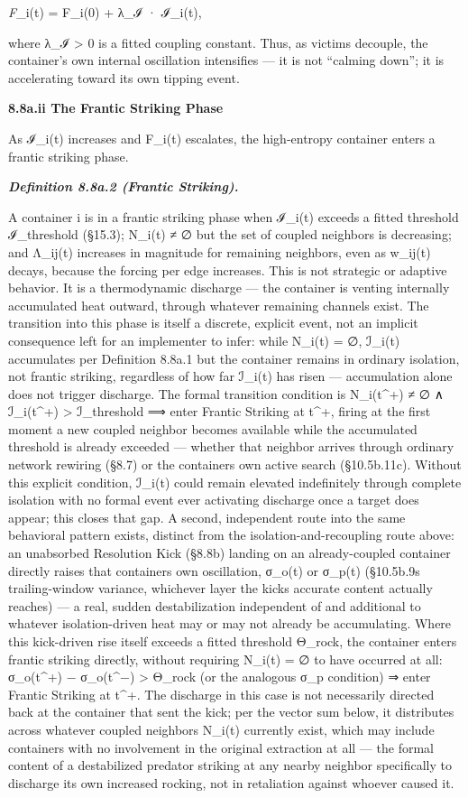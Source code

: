 \documentclass[
]{article}
\begin{document}
\emph{F}\_i(t) = F\_i(0) + λ\_ℐ · ℐ\_i(t),

where λ\_ℐ \textgreater{} 0 is a fitted coupling constant. Thus, as
victims decouple, the container's own internal oscillation intensifies
--- it is not ``calming down''; it is accelerating toward its own
tipping event.

\textbf{8.8a.ii The Frantic Striking Phase}

As ℐ\_i(t) increases and F\_i(t) escalates, the high-entropy container
enters a frantic striking phase.

\emph{\textbf{Definition 8.8a.2 (Frantic Striking).}}

A container i is in a frantic striking phase when ℐ\_i(t) exceeds a
fitted threshold ℐ\_threshold (§15.3); N\_i(t) ≠ ∅ but the set of
coupled neighbors is decreasing; and Λ\_ij(t) increases in magnitude for
remaining neighbors, even as w\_ij(t) decays, because the forcing per
edge increases. This is not strategic or adaptive behavior. It is a
thermodynamic discharge --- the container is venting internally
accumulated heat outward, through whatever remaining channels exist. The
transition into this phase is itself a discrete, explicit event, not an
implicit consequence left for an implementer to infer: while N\_i(t) =
∅, ℐ\_i(t) accumulates per Definition 8.8a.1 but the container remains
in ordinary isolation, not frantic striking, regardless of how far
ℐ\_i(t) has risen --- accumulation alone does not trigger discharge. The
formal transition condition is N\_i(t\^{}+) ≠ ∅ ∧ ℐ\_i(t\^{}+)
\textgreater{} ℐ\_threshold ⟹ enter Frantic Striking at t\^{}+, firing
at the first moment a new coupled neighbor becomes available while the
accumulated threshold is already exceeded --- whether that neighbor
arrives through ordinary network rewiring (§8.7) or the containers own
active search (§10.5b.11c). Without this explicit condition, ℐ\_i(t)
could remain elevated indefinitely through complete isolation with no
formal event ever activating discharge once a target does appear; this
closes that gap. A second, independent route into the same behavioral
pattern exists, distinct from the isolation-and-recoupling route above:
an unabsorbed Resolution Kick (§8.8b) landing on an already-coupled
container directly raises that containers own oscillation, σ\_o(t) or
σ\_p(t) (§10.5b.9s trailing-window variance, whichever layer the kicks
accurate content actually reaches) --- a real, sudden destabilization
independent of and additional to whatever isolation-driven heat may or
may not already be accumulating. Where this kick-driven rise itself
exceeds a fitted threshold Θ\_rock, the container enters frantic
striking directly, without requiring N\_i(t) = ∅ to have occurred at
all: σ\_o(t\^{}+) − σ\_o(t\^{}−) \textgreater{} Θ\_rock (or the
analogous σ\_p condition) ⇒ enter Frantic Striking at t\^{}+. The
discharge in this case is not necessarily directed back at the container
that sent the kick; per the vector sum below, it distributes across
whatever coupled neighbors N\_i(t) currently exist, which may include
containers with no involvement in the original extraction at all --- the
formal content of a destabilized predator striking at any nearby
neighbor specifically to discharge its own increased rocking, not in
retaliation against whoever caused it.
\end{document}
